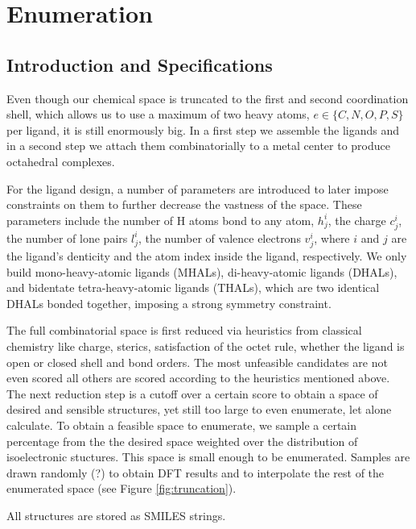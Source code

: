 \section{Enumeration}
\label{sec:enum}
\subsection{Introduction and Specifications}
Even though our chemical space is truncated to the first and second coordination shell, which allows us to use a maximum of two heavy atoms, $e \in \{C,N,O,P,S\} $ per ligand, it is still enormously big. In a first step we assemble the ligands and in a second step we attach them combinatorially to a metal center to produce octahedral complexes. 

For the ligand design, a number of parameters are introduced to later impose constraints on them to further decrease the vastness of the space. These parameters include the number of H atoms bond to any atom, $h^i_j$, the charge $c^i_j$, the number of lone pairs $l^i_j$, the number of valence electrons $v^i_j$, where $i$ and $j$ are the ligand's denticity and the atom index inside the ligand, respectively. We only build mono-heavy-atomic ligands (MHALs), di-heavy-atomic ligands (DHALs), and bidentate tetra-heavy-atomic ligands (THALs), which are two identical DHALs bonded together, imposing a strong symmetry constraint.

The full combinatorial space is first reduced via heuristics from classical chemistry like charge, sterics, satisfaction of the octet rule, whether the ligand is open or closed shell and bond orders. The most unfeasible candidates are not even scored all others are scored according to the heuristics mentioned above. The next reduction step is a cutoff over a certain score to obtain a space of desired and sensible structures, yet still too large to even enumerate, let alone calculate. To obtain a feasible space to enumerate, we sample a certain percentage from the the desired space weighted over the distribution of isoelectronic stuctures. This space is small enough to be enumerated. Samples are drawn randomly (?) to obtain DFT results and to interpolate the rest of the enumerated space (see Figure \ref{fig:truncation}).

All structures are stored as SMILES strings. 
 
